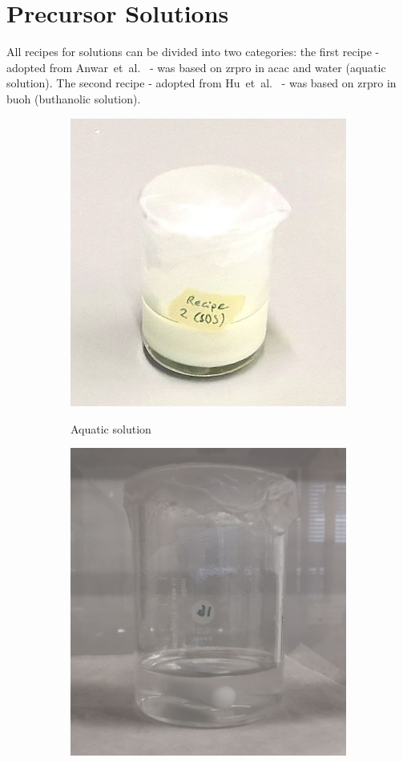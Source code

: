 \section{Precursor Solutions}
\label{sec:exp-sol}
All recipes for solutions can be divided into two categories:
the first recipe - adopted from Anwar~et~al.~\cite{Anwar2017} - was based on \gls{zrpro} in \gls{acac} and \gls{water} (aquatic solution).
The second recipe - adopted from Hu~et~al.~\cite{Hu2016} - was based on \gls{zrpro} in \gls{buoh} (buthanolic solution).

\iffalse
\begin{figure}[htb]
	\centering
	\begin{subfigure}{0.49\textwidth}
		\centering
		\includegraphics[height=0.8\textwidth]{Pics/sol-aq.png}
		\label{fig:sol-aq}
		\caption{Aquatic solution}
	\end{subfigure}
	\begin{subfigure}{0.49\textwidth}
		\centering
		\includegraphics[height=0.8\textwidth]{Pics/sol-bu.png}

\end{subfigure}
\end{figure}
